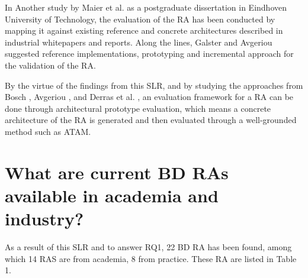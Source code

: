 \documentclass{ieeeaccess}
\begin{document}
In Another study by Maier et al. \cite{Maier} as a postgraduate dissertation in Eindhoven University of Technology, the evaluation of the RA has been conducted by mapping it against existing reference and concrete architectures described in industrial whitepapers and reports. Along the lines, Galster and Avgeriou \cite{galster2011empirically} suggested reference implementations, prototyping and incremental approach for the validation of the RA.

By the virtue of the findings from this SLR, and by studying the approaches from Bosch \cite{bosch2000design}, Avgeriou \cite{avgeriou2003describing}, and Derras et al. \cite{derras2018reference}, an evaluation framework for a RA can be done through architectural prototype evaluation, which means a concrete architecture of the RA is generated and then evaluated through a well-grounded method such as ATAM.

\section{What are current BD RAs available in academia and industry?}

As a result of this SLR and to answer RQ1, 22 BD RA has been found, among which 14 RAS are from academia, 8 from practice. These RA are listed in Table 1.
\end{document}
